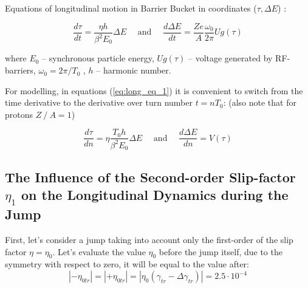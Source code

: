 \documentclass[a4paper,
               keeplastbox,   %
               ]{jacow}
\begin{document}
Equations of longitudinal motion in Barrier Bucket in coordinates ($\tau,\Delta E$) \cite{Hans}:

\begin{equation}\label{eq:long_eq_1}
\frac{d \tau}{d t}=\frac{\eta h}{\beta^{2} E_{0}} \Delta E \quad \text { and } \quad \frac{d \Delta E}{d t}=\frac{Z e}{A} \frac{\omega_{0}}{2 \pi} U g(\tau)
\end{equation}

\noindent where $E_0$ – synchronous particle energy, $Ug(\tau)$ – voltage generated by RF-barriers, $\omega_{0}=2\pi/T_{0}$ , $h$ – harmonic number.
\par For modelling, in equations (\ref{eq:long_eq_1}) it is convenient to switch from the time derivative to the derivative over turn number $t=nT_{0}$: (also note that for protons $Z⁄A=1$)

\begin{equation}\label{eq:long_eq_2}
\frac{d \tau}{d n}=\eta \frac{T_{0} h}{\beta^{2} E_{0}} \Delta E \quad \text { and } \quad \frac{d \Delta E}{d n}=V(\tau)
\end{equation}

\subsection{The Influence of the Second-order Slip-factor  $\eta_{1}$ on the Longitudinal Dynamics during the Jump}

First, let's consider a jump taking into account only the first-order of the slip factor $\eta=\eta_{0}$. Let's evaluate the value $\eta_{0}$ before the jump itself, due to the symmetry with respect to zero, it will be equal to the value after:
$$
\left|-\eta_{0 t r}\right|=\left|+\eta_{0 t r}\right|=\left|\eta_{0}\left(\gamma_{t r}-\Delta \gamma_{t r}\right)\right|=2.5 \cdot 10^{-4}
$$
\end{document}
